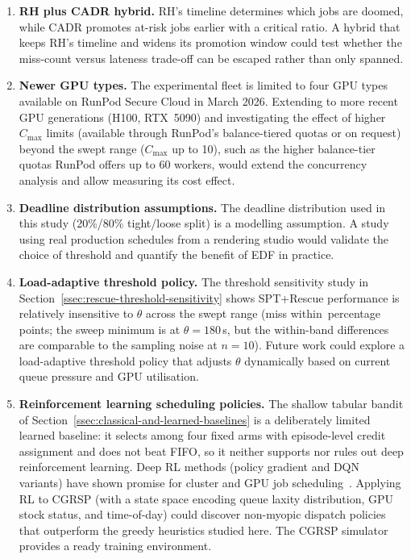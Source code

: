 {\begin{enumerate}
  \item \textbf{RH plus CADR hybrid.} RH's timeline determines which jobs are doomed, while CADR promotes at-risk jobs earlier with a critical ratio. A hybrid that keeps RH's timeline and widens its promotion window could test whether the miss-count versus lateness trade-off can be escaped rather than only spanned.

  \item \textbf{Newer GPU types.} The experimental fleet is limited to four GPU types available on RunPod Secure Cloud in March 2026. Extending to more recent GPU generations (H100, RTX~5090) and investigating the effect of higher $C_{\max}$ limits (available through RunPod's balance-tiered quotas or on request) beyond the swept range ($C_{\max}$ up to 10), such as the higher balance-tier quotas RunPod offers up to 60 workers, would extend the concurrency analysis and allow measuring its cost effect.

  \item \textbf{Deadline distribution assumptions.} The deadline distribution used in this study (20\%/80\% tight/loose split) is a modelling assumption. A study using real production schedules from a rendering studio would validate the choice of threshold and quantify the benefit of EDF in practice.

  \item \textbf{Load-adaptive threshold policy.} The threshold sensitivity study in Section~\ref{ssec:rescue-threshold-sensitivity} shows SPT+Rescue performance is relatively insensitive to $\theta$ across the swept range (miss within \ThrMissSpread\,percentage points; the sweep minimum is at $\theta=180$\,s, but the within-band differences are comparable to the sampling noise at $n=10$). Future work could explore a load-adaptive threshold policy that adjusts $\theta$ dynamically based on current queue pressure and GPU utilisation.

  \item \textbf{Reinforcement learning scheduling policies.} The shallow tabular bandit of Section~\ref{ssec:classical-and-learned-baselines} is a deliberately limited learned baseline: it selects among four fixed arms with episode-level credit assignment and does not beat FIFO, so it neither supports nor rules out deep reinforcement learning. Deep RL methods (policy gradient and DQN variants) have shown promise for cluster and GPU job scheduling~\cite{mao2016resource,chen2023gpu}. Applying RL to CGRSP (with a state space encoding queue laxity distribution, GPU stock status, and time-of-day) could discover non-myopic dispatch policies that outperform the greedy heuristics studied here. The CGRSP simulator provides a ready training environment.


\end{enumerate}}

